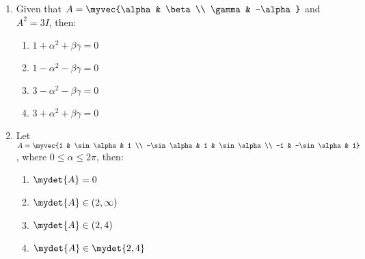 \documentclass{article}
\begin{document}
\begin{enumerate}
    \item Given that $A = \myvec{\alpha & \beta \\ \gamma & -\alpha}$ and $A^2 = 3I$, then:
    \begin{enumerate}
        \item $1 + \alpha^2 + \beta\gamma = 0$
        \item $1 - \alpha^2 - \beta\gamma = 0$
        \item $3 - \alpha^2 - \beta\gamma = 0$
        \item $3 + \alpha^2 + \beta\gamma = 0$
    \end{enumerate}
    \item Let $A =\myvec{1 & \sin\alpha & 1 \\ -\sin\alpha & 1 & \sin\alpha \\ -1 & -\sin\alpha & 1}$, where $0\leq\alpha\leq2\pi$, then:
    \begin{enumerate}
        \item $\mydet{A} = 0$
        \item $\mydet{A} \in (2,\infty)$
        \item $\mydet{A} \in (2,4)$
        \item $\mydet{A} \in \mydet{2,4}$
    \end{enumerate}

\end{enumerate}
\end{document}
